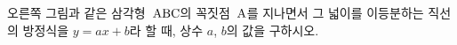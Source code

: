 \noindent\begin{minipage}[t]{0.58\linewidth}\vspace{0pt}오른쪽 그림과 같은 삼각형~$\mathrm{ABC}$의 꼭짓점~$\mathrm{A}$를 지나면서 그 넓이를 이등분하는 직선의 방정식을 $y=ax+b$라 할 때, 상수 $a$, $b$의 값을 구하시오.\end{minipage}\hfill\begin{minipage}[t]{0.4\linewidth}\vspace{0pt}\centering \end{minipage}\par
